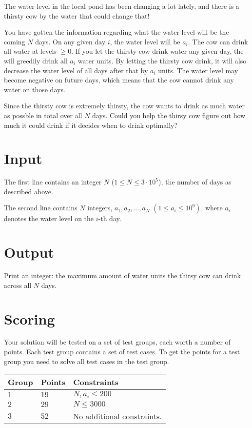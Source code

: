 
The water level in the local pond has been changing a lot lately, and there is a thirsty cow by the water that could change that!

You have gotten the information regarding what the water level will be the coming $N$ days. 
On any given day $i$, the water level will be $a_i$. The cow can drink all water at levels $\geq 0$.
If you let the thirsty cow drink water any given day, the will greedily drink all $a_i$ water units. 
By letting the thirsty cow drink, it will also decrease the water level of all days after that by $a_i$ units. 
The water level may become negative on future days, which means that the cow cannot drink any water on those days.

Since the thirsty cow is extremely thirsty, the cow wants to drink as much water as possble in total over all $N$ days.
Could you help the thirsy cow figure out how much it could drink if it decides when to drink optimally?

\section*{Input}
The first line contains an integer $N$ ($1 \leq N \leq 3 \cdot 10^5$), the number of days as described above.

The second line contains $N$ integers, $a_1, a_2, \dots, a_N$ $(1 \leq a_i \leq 10^9)$, where $a_i$ denotes the water level on the $i$-th day.

\section*{Output}
Print an integer: the maximum amount of water units the thirsy cow can drink across all $N$ days. 

\section*{Scoring}
Your solution will be tested on a set of test groups, each worth a number of points. Each test group contains
a set of test cases. To get the points for a test group you need to solve all test cases in the test group.

\noindent
\begin{tabular}{| l | l | p{12cm} |}
  \hline
  \textbf{Group} & \textbf{Points} & \textbf{Constraints} \\ \hline
  $1$    & $19$       & $N, a_i \leq 200$ \\ \hline
  $2$    & $29$       & $N \leq 3000$ \\ \hline
  $3$    & $52$       & No additional constraints. \\ \hline
\end{tabular}


